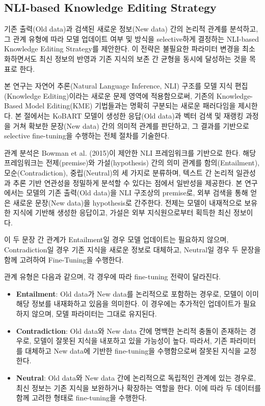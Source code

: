 \documentclass[a4paper,fleqn]{cas-sc}
\begin{document}
\subsection{NLI-based Knowledge Editing Strategy}

기존 출력(Old data)과 검색된 새로운 정보(New data) 간의 논리적 관계를 분석하고, 그 관계 유형에 따라 모델 업데이트 여부 및 방식을 selective하게 결정하는 NLI-based Knowledge Editing Strategy를 제안한다. 이 전략은 불필요한 파라미터 변경을 최소화하면서도 최신 정보의 반영과 기존 지식의 보존 간 균형을 동시에 달성하는 것을 목표로 한다. 

본 연구는 자연어 추론(Natural Language Inference, NLI) 구조를 모델 지식 편집(Knowledge Editing)이라는 새로운 문제 영역에 적용함으로써, 기존의 Knowledge-Based Model Editing(KME) 기법들과는 명확히 구분되는 새로운 패러다임을 제시한다. 본 절에서는 KoBART 모델이 생성한 응답(Old data)과 벡터 검색 및 재랭킹 과정을 거쳐 확보한 문장(New data) 간의 의미적 관계를 판단하고, 그 결과를 기반으로 selective fine-tuning을 수행하는 전체 절차를 기술한다.

관계 분석은 Bowman et al. (2015)이 제안한 NLI 프레임워크를 기반으로 한다. 해당 프레임워크는 전제(premise)와 가설(hypothesis) 간의 의미 관계를 함의(Entailment), 모순(Contradiction), 중립(Neutral)의 세 가지로 분류하며, 텍스트 간 논리적 일관성과 추론 기반 연관성을 정밀하게 분석할 수 있다는 점에서 일반성을 제공한다. 본 연구에서는 모델의 기존 출력(Old data)을 NLI 구조상의 premise로, 외부 검색을 통해 얻은 새로운 문장(New data)을 hypothesis로 간주한다. 전제는 모델이 내재적으로 보유한 지식에 기반해 생성한 응답이고, 가설은 외부 지식원으로부터 획득한 최신 정보이다.

이 두 문장 간 관계가 Entailment일 경우 모델 업데이트는 필요하지 않으며, Contradiction일 경우 기존 지식을 새로운 정보로 대체하고, Neutral일 경우 두 문장을 함께 고려하여 Fine-Tuning을 수행한다.

관계 유형은 다음과 같으며, 각 경우에 따라 fine-tuning 전략이 달라진다.


\begin{itemize}
    \item{\textbf{Entailment}:
    Old data가 New data를 논리적으로 포함하는 경우로, 모델이 이미 해당 정보를 내재화하고 있음을 의미한다. 이 경우에는 추가적인 업데이트가 필요하지 않으며, 모델 파라미터는 그대로 유지된다.}
    
    \item{\textbf{Contradiction}:
    Old data와 New data 간에 명백한 논리적 충돌이 존재하는 경우로, 모델이 잘못된 지식을 내포하고 있을 가능성이 높다. 따라서, 기존 파라미터를 대체하고 New data에 기반한 fine-tuning을 수행함으로써 잘못된 지식을 교정한다.}
    
    \item{\textbf{Neutral}:
    Old data와 New data 간에 논리적으로 독립적인 관계에 있는 경우로, 최신 정보는 기존 지식을 보완하거나 확장하는 역할을 한다. 이에 따라 두 데이터를 함께 고려한 형태로 fine-tuning을 수행한다.}

\end{itemize}  
\end{document}
